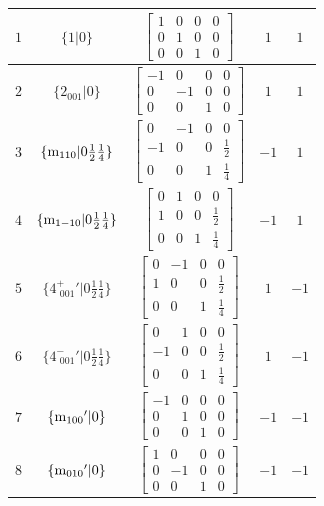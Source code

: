 \documentclass[fleqn,8pt]{jsarticle}
\begin{document}
\begin{longtable}{ccccc}
$ 1 $ & $ \{1|0\} $ & $ \begin{bmatrix} 1 & 0 & 0 & 0 \\ 0 & 1 & 0 & 0 \\ 0 & 0 & 1 & 0 \end{bmatrix} $ & $ 1 $ & $ 1 $ \\ \hline
$ 2 $ & $ \{2{}_{001}|0\} $ & $ \begin{bmatrix} -1 & 0 & 0 & 0 \\ 0 & -1 & 0 & 0 \\ 0 & 0 & 1 & 0 \end{bmatrix} $ & $ 1 $ & $ 1 $ \\ \hline
$ 3 $ & $ \{{\rm m}_{110}|0 \frac{1}{2} \frac{1}{4}\} $ & $ \begin{bmatrix} 0 & -1 & 0 & 0 \\ -1 & 0 & 0 & \frac{1}{2} \\ 0 & 0 & 1 & \frac{1}{4} \end{bmatrix} $ & $ -1 $ & $ 1 $ \\ \hline
$ 4 $ & $ \{{\rm m}_{1-10}|0 \frac{1}{2} \frac{1}{4}\} $ & $ \begin{bmatrix} 0 & 1 & 0 & 0 \\ 1 & 0 & 0 & \frac{1}{2} \\ 0 & 0 & 1 & \frac{1}{4} \end{bmatrix} $ & $ -1 $ & $ 1 $ \\ \hline
$ 5 $ & $ \{4^{+}_{\,\,001}{}'|0 \frac{1}{2} \frac{1}{4}\} $ & $ \begin{bmatrix} 0 & -1 & 0 & 0 \\ 1 & 0 & 0 & \frac{1}{2} \\ 0 & 0 & 1 & \frac{1}{4} \end{bmatrix} $ & $ 1 $ & $ -1 $ \\ \hline
$ 6 $ & $ \{4^{-}_{\,\,001}{}'|0 \frac{1}{2} \frac{1}{4}\} $ & $ \begin{bmatrix} 0 & 1 & 0 & 0 \\ -1 & 0 & 0 & \frac{1}{2} \\ 0 & 0 & 1 & \frac{1}{4} \end{bmatrix} $ & $ 1 $ & $ -1 $ \\ \hline
$ 7 $ & $ \{{\rm m}_{100}{}'|0\} $ & $ \begin{bmatrix} -1 & 0 & 0 & 0 \\ 0 & 1 & 0 & 0 \\ 0 & 0 & 1 & 0 \end{bmatrix} $ & $ -1 $ & $ -1 $ \\ \hline
$ 8 $ & $ \{{\rm m}_{010}{}'|0\} $ & $ \begin{bmatrix} 1 & 0 & 0 & 0 \\ 0 & -1 & 0 & 0 \\ 0 & 0 & 1 & 0 \end{bmatrix} $ & $ -1 $ & $ -1 $ \\ \hline

\end{longtable}
\end{document}
